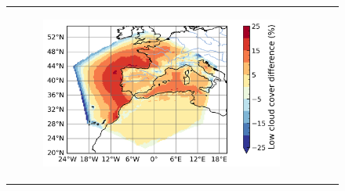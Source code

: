 \begin{figure}[htbp]
\begin{tabular}{ccc}
\begin{subfigure}[b]{0.33\textwidth}
            \includegraphics[width=\textwidth]{images/chap4/domain_size/diff_map_cldl_era_LAM_2000km_NBP80.png}
        \end{subfigure} \\


\end{tabular}
\end{figure}
